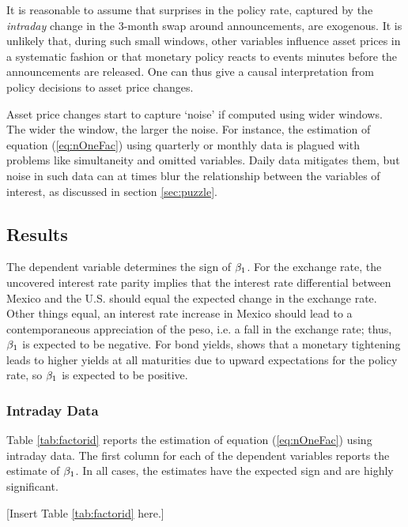 It is reasonable to assume that surprises in the policy rate, captured by the \textit{intraday} change in the 3-month swap around announcements, are exogenous. It is unlikely that, during such small windows, other variables influence asset prices in a systematic fashion or that monetary policy reacts to events minutes before the announcements are released. One can thus give a causal interpretation from policy decisions to asset price changes. 

Asset price changes start to capture `noise' if computed using wider windows. The wider the window, the larger the noise. For instance, the estimation of equation (\ref{eq:nOneFac}) using quarterly or monthly data is plagued with problems like simultaneity and omitted variables. Daily data mitigates them, but noise in such data can at times blur the relationship between the variables of interest, as discussed in section \ref{sec:puzzle}. 

\sectitlespace
\subsection{Results}
\sectitlespace
The dependent variable determines the sign of \(\beta_{1}\). For the exchange rate, the uncovered interest rate parity implies that the interest rate differential between Mexico and the U.S. should equal the expected change in the exchange rate. Other things equal, an interest rate increase in Mexico should lead to a contemporaneous appreciation of the peso, i.e. a fall in the exchange rate; thus, \(\beta_{1}\) is expected to be negative. For bond yields, \textcite{Kuttner:2001} shows that a monetary tightening leads to higher yields at all maturities due to upward expectations for the policy rate, so \(\beta_{1}\) is expected to be positive. 

\sectitlespace
\subsubsection{Intraday Data}
\sectitlespace
Table \ref{tab:factorid} reports the estimation of equation (\ref{eq:nOneFac}) using intraday data. The first column for each of the dependent variables reports the estimate of \(\beta_{1}\). In all cases, the estimates have the expected sign and are highly significant.

%
\begin{center}
	[Insert Table \ref{tab:factorid} here.]
\end{center}

